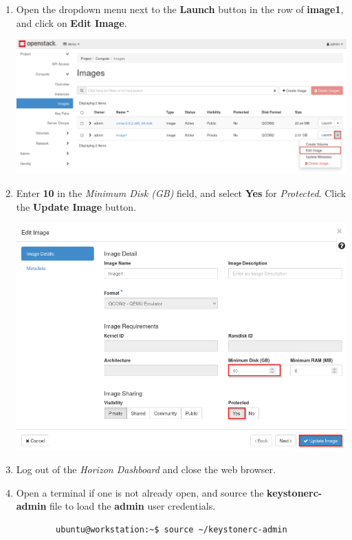 \documentclass[letterpaper, 12pt]{article}
\begin{document}
\begin{enumerate}
    \item Open the dropdown menu next to the \textbf{Launch} button in the row of \textbf{image1}, and click on
    \textbf{Edit Image}.

    \begin{center}
        \includegraphics[width=\linewidth]{images/part1/step7.png}
    \end{center}

    \item Enter \textbf{10} in the \textit{Minimum Disk (GB)} field, and select \textbf{Yes} for \textit{Protected}.
    Click the \textbf{Update Image} button.

    \begin{center}
        \includegraphics[width=\linewidth]{images/part1/step8.png}
    \end{center}

    \item Log out of the \textit{Horizon Dashboard} and close the web browser.

    \item Open a terminal if one is not already open, and source the \textbf{keystonerc-admin} file to load the
    \textbf{admin} user credentials.
    \begin{lstlisting}
        ubuntu@workstation:~$ source ~/keystonerc-admin
    \end{lstlisting}


\end{enumerate}
\end{document}
